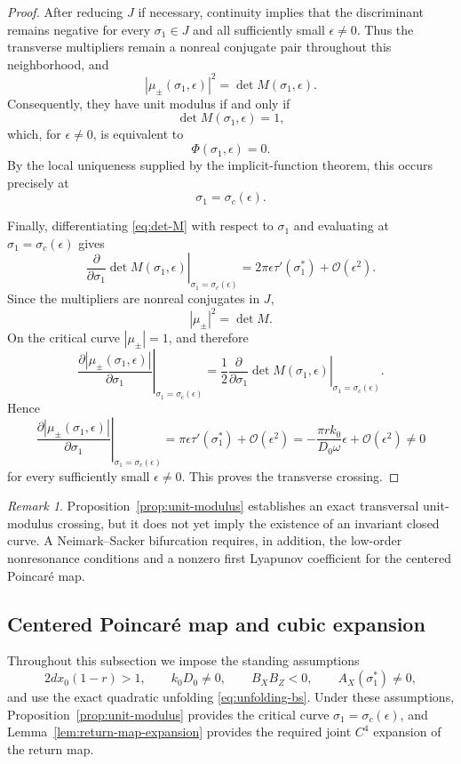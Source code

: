 \documentclass[11pt]{amsart}
\theoremstyle{remark}
\newtheorem{remark}[theorem]{Remark}
\newcommand{\cO}{\mathcal{O}}
\begin{document}
\begin{proof}
After reducing $J$ if necessary, continuity implies that the
discriminant remains negative for every $\sigma_1\in J$ and all
sufficiently small $\epsilon\ne0$. Thus the transverse multipliers remain
a nonreal conjugate pair throughout this neighborhood, and
\[
|\mu_\pm(\sigma_1,\epsilon)|^2
=
\det M(\sigma_1,\epsilon).
\]
Consequently, they have unit modulus if and only if
\[
\det M(\sigma_1,\epsilon)=1,
\]
which, for $\epsilon\ne0$, is equivalent to
\[
\Phi(\sigma_1,\epsilon)=0.
\]
By the local uniqueness supplied by the implicit-function theorem, this
occurs precisely at
\[
\sigma_1=\sigma_c(\epsilon).
\]

Finally, differentiating \eqref{eq:det-M} with respect to $\sigma_1$ and
evaluating at $\sigma_1=\sigma_c(\epsilon)$ gives
\[
\left.
\frac{\partial}{\partial\sigma_1}
\det M(\sigma_1,\epsilon)
\right|_{\sigma_1=\sigma_c(\epsilon)}
=
2\pi\epsilon\tau'(\sigma_1^*)
+
\cO(\epsilon^2).
\]
Since the multipliers are nonreal conjugates in $J$,
\[
|\mu_\pm|^2=\det M.
\]
On the critical curve $|\mu_\pm|=1$, and therefore
\[
\left.
\frac{\partial|\mu_\pm(\sigma_1,\epsilon)|}
{\partial\sigma_1}
\right|_{\sigma_1=\sigma_c(\epsilon)}
=
\frac12
\left.
\frac{\partial}{\partial\sigma_1}
\det M(\sigma_1,\epsilon)
\right|_{\sigma_1=\sigma_c(\epsilon)}.
\]
Hence
\[
\left.
\frac{\partial|\mu_\pm(\sigma_1,\epsilon)|}
{\partial\sigma_1}
\right|_{\sigma_1=\sigma_c(\epsilon)}
=
\pi\epsilon\tau'(\sigma_1^*)
+
\cO(\epsilon^2)
=
-\frac{\pi r k_0}{D_0\omega}\epsilon
+
\cO(\epsilon^2)
\ne0
\]
for every sufficiently small $\epsilon\ne0$.
This proves the transverse crossing.
\end{proof}

\begin{remark}\label{rem:unit-modulus-not-NS}
Proposition~\ref{prop:unit-modulus} establishes an exact transversal
unit-modulus crossing, but it does not yet imply the existence of an invariant
closed curve.  A Neimark--Sacker bifurcation requires, in addition, the
low-order nonresonance conditions and a nonzero first Lyapunov coefficient for
the centered Poincar\'e map.
\end{remark}

\subsection{Centered Poincar\'e map and cubic expansion}

Throughout this subsection we impose the standing assumptions
\begin{equation}\label{eq:standing-assumptions}
2dx_0(1-r)>1,\qquad k_0D_0\ne0,\qquad
B_XB_Z<0,\qquad A_X(\sigma_1^*)\ne0,
\end{equation}
and use the exact quadratic unfolding \eqref{eq:unfolding-bs}.  Under these
assumptions, Proposition~\ref{prop:unit-modulus} provides the critical curve
\(\sigma_1=\sigma_c(\epsilon)\), and
Lemma~\ref{lem:return-map-expansion} provides the required joint \(C^4\)
expansion of the return map.
\end{document}
